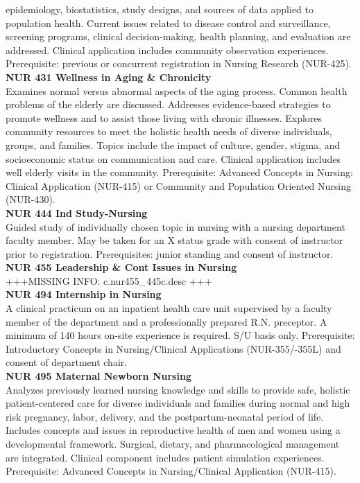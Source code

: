 \documentclass[
  letterpaper,
]{scrbook}
\begin{document}
epidemiology, biostatistics, study designs, and sources of data applied
to population health. Current issues related to disease control and
surveillance, screening programs, clinical decision-making, health
planning, and evaluation are addressed. Clinical application includes
community observation experiences. Prerequisite: previous or concurrent
registration in Nursing Research (NUR-425).\\
\textbf{NUR 431 Wellness in Aging \& Chronicity}\\
Examines normal versus abnormal aspects of the aging process. Common
health problems of the elderly are discussed. Addresses evidence-based
strategies to promote wellness and to assist those living with chronic
illnesses. Explores community resources to meet the holistic health
needs of diverse individuals, groups, and families. Topics include the
impact of culture, gender, stigma, and socioeconomic status on
communication and care. Clinical application includes well elderly
visits in the community. Prerequisite: Advanced Concepts in Nursing:
Clinical Application (NUR-415) or Community and Population Oriented
Nursing (NUR-430).\\
\textbf{NUR 444 Ind Study-Nursing}\\
Guided study of individually chosen topic in nursing with a nursing
department faculty member. May be taken for an X status grade with
consent of instructor prior to registration. Prerequisites: junior
standing and consent of instructor.\\
\textbf{NUR 455 Leadership \& Cont Issues in Nursing}\\
+++MISSING INFO: c.nur455\_445c.desc +++\\
\textbf{NUR 494 Internship in Nursing}\\
A clinical practicum on an inpatient health care unit supervised by a
faculty member of the department and a professionally prepared R.N.
preceptor. A minimum of 140 hours on-site experience is required. S/U
basis only. Prerequisite: Introductory Concepts in Nursing/Clinical
Applications (NUR-355/-355L) and consent of department chair.\\
\textbf{NUR 495 Maternal Newborn Nursing}\\
Analyzes previously learned nursing knowledge and skills to provide
safe, holistic patient-centered care for diverse individuals and
families during normal and high risk pregnancy, labor, delivery, and the
postpartum-neonatal period of life. Includes concepts and issues in
reproductive health of men and women using a developmental framework.
Surgical, dietary, and pharmacological management are integrated.
Clinical component includes patient simulation experiences.
Prerequisite: Advanced Concepts in Nursing/Clinical Application
(NUR-415).
\end{document}
